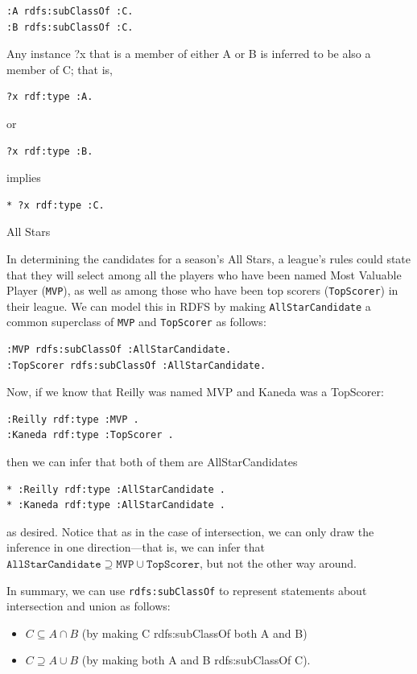 \begin{lstlisting}
:A rdfs:subClassOf :C.
:B rdfs:subClassOf :C.
\end{lstlisting}

Any instance ?x that is a member of either A or B is inferred to be also
a member of C; that is,

\begin{lstlisting}
?x rdf:type :A.
\end{lstlisting}

or

\begin{lstlisting}
?x rdf:type :B.
\end{lstlisting}

implies

\begin{lstlisting}
* ?x rdf:type :C.
\end{lstlisting}

\begin{example}{All Stars}

In determining the candidates for a season's All Stars, a league's rules
could state that they will select among all the players who have been
named Most Valuable Player (\texttt{MVP}), as well as among those who have been
top scorers (\texttt{TopScorer}) in their league. We can model this in RDFS by
making \texttt{AllStarCandidate} a common superclass of \texttt{MVP} and \texttt{TopScorer} as
follows:

\begin{lstlisting}
:MVP rdfs:subClassOf :AllStarCandidate.
:TopScorer rdfs:subClassOf :AllStarCandidate.
\end{lstlisting}

Now, if we know that Reilly was named MVP and Kaneda was a TopScorer:

\begin{lstlisting}
:Reilly rdf:type :MVP .
:Kaneda rdf:type :TopScorer .
\end{lstlisting}

then we can infer that both of them are AllStarCandidates

\begin{lstlisting}
* :Reilly rdf:type :AllStarCandidate .
* :Kaneda rdf:type :AllStarCandidate .
\end{lstlisting}

as desired. Notice that as in the case of intersection, we can only draw
the inference in one direction---that is, we can infer that
$\texttt{AllStarCandidate} \supseteq \texttt{MVP} \cup \texttt{TopScorer}$, but not the other way around.

In summary, we can use \texttt{rdfs:subClassOf} to represent statements about
intersection and union as
follows:

\begin{itemize}
\item $C \subseteq A \cap B$ (by making C rdfs:subClassOf both A and B)

\item $C \supseteq  A \cup B$ (by making both A and B rdfs:subClassOf C).
\end{itemize}
\end{example}

